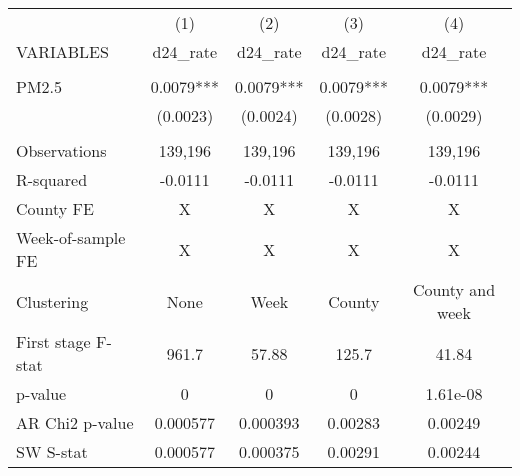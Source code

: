 \begin{tabular}{lcccc} \hline
 & (1) & (2) & (3) & (4) \\
VARIABLES & d24\_rate & d24\_rate & d24\_rate & d24\_rate \\ \hline
 &  &  &  &  \\
PM2.5 & 0.0079*** & 0.0079*** & 0.0079*** & 0.0079*** \\
 & (0.0023) & (0.0024) & (0.0028) & (0.0029) \\
 &  &  &  &  \\
Observations & 139,196 & 139,196 & 139,196 & 139,196 \\
R-squared & -0.0111 & -0.0111 & -0.0111 & -0.0111 \\
County FE & X & X & X & X \\
Week-of-sample FE & X & X & X & X \\
Clustering & None & Week & County & County and week \\
First stage F-stat & 961.7 & 57.88 & 125.7 & 41.84 \\
p-value & 0 & 0 & 0 & 1.61e-08 \\
AR Chi2 p-value & 0.000577 & 0.000393 & 0.00283 & 0.00249 \\
 SW S-stat & 0.000577 & 0.000375 & 0.00291 & 0.00244 \\ \hline
\end{tabular}
